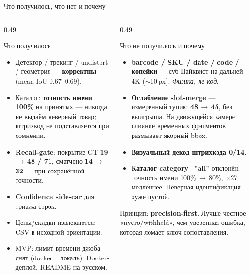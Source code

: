 \documentclass[aspectratio=169,10pt]{beamer}
\newcommand{\code}[1]{{\ttfamily\small\color{slate}#1}}
\newcommand{\hl}[1]{{\bfseries\color{accent}#1}}
\newcommand{\hr}[1]{{\bfseries\color{redtag}#1}}
\newcommand{\hg}[1]{{\bfseries\color{good}#1}}
\begin{document}
\begin{frame}{Что получилось, что нет и почему}
  \begin{columns}[T,onlytextwidth]
    \begin{column}{0.49\textwidth}
      \begin{block}{\textcolor{good}{Что получилось}}\footnotesize
        \begin{itemize}\setlength\itemsep{1.5pt}
          \item Детектор / трекинг / undistort / геометрия — \hg{корректны} (mean IoU 0.67--0.69).
          \item Каталог: \hg{точность имени 100\%} на принятых — никогда не выдаём неверный товар; штрихкод не подставляется при сомнении.
          \item \hl{Recall-gate}: покрытие GT \hg{19\,$\to$\,48 / 71}, сматчено \hg{14\,$\to$\,32} — при сохранённой точности.
          \item \hl{Confidence side-car} для триажа строк.
          \item Цены/скидки извлекаются; CSV в исходной ориентации.
          \item MVP: лимит времени джоба снят (docker\,=\,локаль), Docker-деплой, README на русском.
        \end{itemize}
      \end{block}
    \end{column}
    \begin{column}{0.49\textwidth}
      \begin{block}{\textcolor{redtag}{Что не получилось и почему}}\footnotesize
        \begin{itemize}\setlength\itemsep{1.5pt}
          \item \hr{barcode / SKU / date / code / копейки} — суб-Найквист на дальней 4K ($\sim$10\,px). \emph{Физика, не код.}
          \item \hr{Ослабление slot-merge} — измеренный тупик: \hr{48\,$\to$\,45}, без выигрыша. На движущейся камере слияние временных фрагментов размывает якорный bbox.
          \item \hr{Визуальный декод штрихкода 0/14}.
          \item \hr{Каталог \code{category="all"}} отклонён: точность имени 100\%\,$\to$\,80\%, $\times$27 медленнее. Неверная идентификация хуже пустой.
        \end{itemize}
      \end{block}
      \vspace{0.2em}
      {\scriptsize\color{slate} Принцип: \hl{precision-first}. Лучше честное «пусто/withheld», чем уверенная ошибка, которая ломает ключ сопоставления.}
    \end{column}
  \end{columns}
\end{frame}
\end{document}
